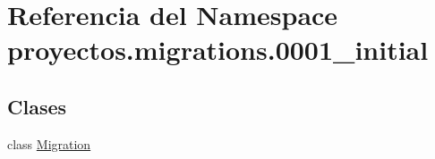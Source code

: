 \hypertarget{namespaceproyectos_1_1migrations_1_10001__initial}{}\section{Referencia del Namespace proyectos.\+migrations.0001\+\_\+initial}
\label{namespaceproyectos_1_1migrations_1_10001__initial}
\subsection*{Clases}
\begin{DoxyCompactItemize}
\item 
class \hyperlink{classproyectos_1_1migrations_1_10001__initial_1_1_migration}{Migration}
\end{DoxyCompactItemize}
